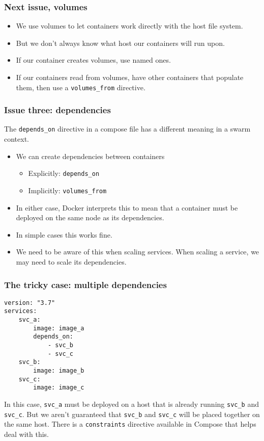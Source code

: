 \documentclass[10pt]{beamer}
\begin{document}
\begin{frame}
  \frametitle{Next issue, volumes}
   
   \begin{itemize}
     \item We use volumes to let containers work directly with the host file system.
     \item But we don't always know what host our containers will run upon.
     \item If our container creates volumes, use named ones.
     \item If our containers read from volumes, have other containers that populate them, then use a \texttt{volumes\_from} directive.
   \end{itemize}
\end{frame}

\begin{frame}
  \frametitle{Issue three: dependencies}
   
   The \texttt{depends\_on} directive in a compose file has a different meaning in a swarm context.
   \begin{itemize}
     \item We can create dependencies between containers
              \begin{itemize}
                \item Explicitly: \texttt{depends\_on}
                \item Implicitly: \texttt{volumes\_from}
              \end{itemize}
         
     \item In either case, Docker interprets this to mean that a container must be deployed on the same node as its dependencies.
     \item In simple cases this works fine.
     \item We need to be aware of this when scaling services. When scaling a service, we may need to scale its dependencies.
   \end{itemize}
\end{frame}


\begin{frame}[fragile]
    \frametitle{The tricky case: multiple dependencies}
    
    \begin{verbatim}
version: "3.7"
services:
    svc_a:  
        image: image_a
        depends_on:
            - svc_b
            - svc_c
    svc_b:  
        image: image_b
    svc_c:  
        image: image_c
    \end{verbatim}
    
    In this case, \texttt{svc\_a} must be deployed on a host that is already running \texttt{svc\_b} and \texttt{svc\_c}. But we aren't guaranteed that 
    \texttt{svc\_b} and \texttt{svc\_c} will be placed together on the same host. There is a \texttt{constraints} directive available in Compose that helps deal with this.
\end{frame}
\end{document}
